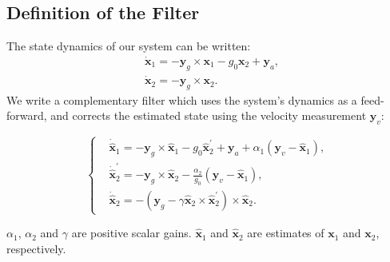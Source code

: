 \documentclass{IJCAS}
\begin{document}
\subsection{Definition of the Filter}
The state dynamics of our system can be written:
\begin{align} 
&\dot{\boldsymbol{x}}_{1} = - \boldsymbol{y}_{g} \times \boldsymbol{x}_{1} - g_{0}\boldsymbol{x}_{2} + \boldsymbol{y}_{a} , \label{eq:x1_dot} \\
&\dot{\boldsymbol{x}}_{2} = - \boldsymbol{y}_{g} \times  \boldsymbol{x}_{2}. \label{eq:x2_dot}
\end{align} 
We write a complementary filter which uses the system's dynamics as a feed-forward, and corrects the estimated state using the velocity measurement $\boldsymbol{y}_{v}$:

\begin{equation}
    \left\{
    \begin{aligned}
        & \dot{\hat{\boldsymbol{x}}}_{1}  = - \boldsymbol{y}_{g} \times \hat{\boldsymbol{x}}_{1} - g_{0} \hat{\boldsymbol{x}}_{2}^{\prime} + \boldsymbol{y}_{a} + \alpha_{1} \left(\boldsymbol{y}_{v} - \hat{\boldsymbol{x}}_{1}\right), \\
    & \dot{\hat{\boldsymbol{x}}}_{2}^{\prime} = -  \boldsymbol{y}_{g} \times \hat{\boldsymbol{x}}_{2} - \frac{\alpha_{2}}{g_{0}} \left(\boldsymbol{y}_{v} - \hat{\boldsymbol{x}}_{1}\right), \\
    & \dot{\hat{\boldsymbol{x}}}_{2} = - \left(\boldsymbol{y}_{g} - \gamma  \hat{\boldsymbol{x}}_{2} \times \hat{\boldsymbol{x}}_{2}^{\prime}\right)\times \hat{\boldsymbol{x}}_{2}.
    \end{aligned}
    \right.
    \label{eq:tilt_dynamics}
\end{equation}


$\alpha_1$, $\alpha_2$ and $\gamma$ are positive scalar gains. $\hat{\boldsymbol{x}}_{1} $ and $\hat{\boldsymbol{x}}_{2} $ are estimates of $\boldsymbol{x}_{1} $ and $\boldsymbol{x}_{2} $, respectively.
\end{document}

